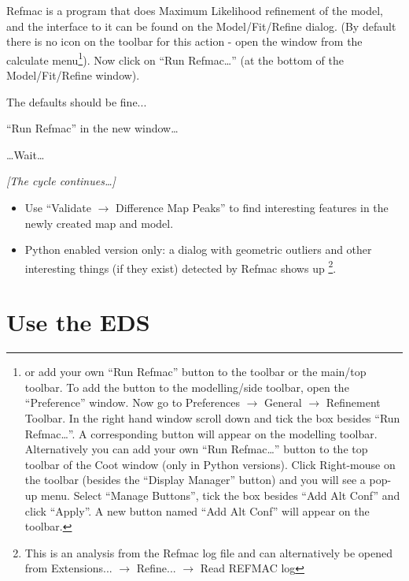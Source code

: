 \documentclass{article}
\begin{document}
Refmac is a program that does Maximum Likelihood refinement of the
model, and the interface to it can be found on the Model/Fit/Refine
dialog. (By default there is no icon on the toolbar for this action
- open the window from the calculate menu\footnote{or add your own 
``Run Refmac'' button to the toolbar or the main/top toolbar. To add 
the button to the modelling/side toolbar, open the ``Preference'' window.
Now go to \textsf{Preferences $\rightarrow$ General $\rightarrow$ 
Refinement Toolbar}. In the right hand window scroll down and tick the
box besides ``Run Refmac\ldots''. A corresponding button will appear on the 
modelling toolbar. Alternatively you can add your own ``Run Refmac\ldots'' 
button to the top toolbar of the Coot window (only in Python 
versions). Click Right-mouse on the toolbar (besides the ``Display Manager'' 
button) and you will see a pop-up menu. Select ``Manage Buttons'',  
tick the box besides ``Add Alt Conf'' and click ``Apply''. A new button 
named ``Add Alt Conf'' will appear on the toolbar.}). Now 
click on \textsf{``Run Refmac\ldots''} (at the bottom of the 
Model/Fit/Refine window).

The defaults should be fine...

\textsf{``Run Refmac''} in the new window\ldots

\ldots Wait\ldots

\emph{[The cycle continues\ldots]}

\begin{itemize}
\item Use \textsf{``Validate $\rightarrow$ Difference Map Peaks''} to
  find interesting features in the newly created map and model.
\item Python enabled version only: a dialog with geometric outliers and
  other interesting things (if they exist) detected by Refmac shows up
  \footnote{This is an analysis from the Refmac log file and can 
  alternatively be opened from \textsf{Extensions... $\rightarrow$ 
  Refine...  $\rightarrow$ Read REFMAC log}}.
\end{itemize}


\section{Use the EDS}
\end{document}
